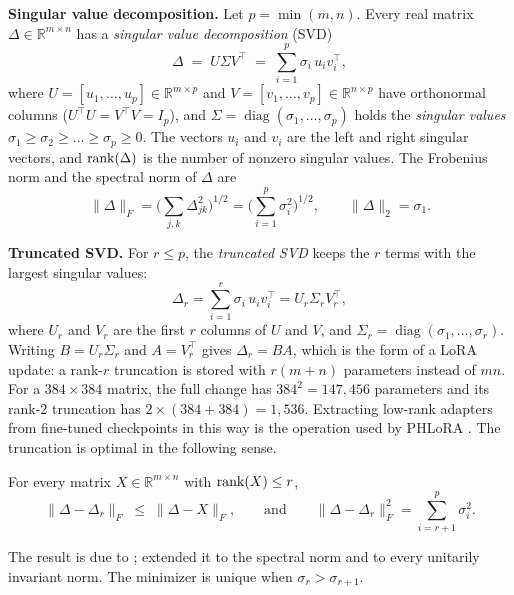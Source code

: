 \textbf{Singular value decomposition.} Let $p=\min(m,n)$. Every real matrix $\Delta\in\mathbb{R}^{m\times n}$ has a \emph{singular value decomposition} (SVD) \cite{golub2013matrix}
\begin{equation}
\Delta \;=\; U\Sigma V^\top \;=\; \sum_{i=1}^{p}\sigma_i\,u_i v_i^\top ,
\label{eq:svdfull}
\end{equation}
where $U=[u_1,\dots,u_p]\in\mathbb{R}^{m\times p}$ and $V=[v_1,\dots,v_p]\in\mathbb{R}^{n\times p}$ have orthonormal columns ($U^\top U=V^\top V=I_p$), and $\Sigma=\operatorname{diag}(\sigma_1,\dots,\sigma_p)$ holds the \emph{singular values} $\sigma_1\ge\sigma_2\ge\dots\ge\sigma_p\ge 0$. The vectors $u_i$ and $v_i$ are the left and right singular vectors, and $\operatorname{rank}(\Delta)$ is the number of nonzero singular values. The Frobenius norm and the spectral norm of $\Delta$ are
\begin{equation}
\|\Delta\|_F=\Big(\sum_{j,k}\Delta_{jk}^2\Big)^{1/2}=\Big(\sum_{i=1}^{p}\sigma_i^2\Big)^{1/2},
\qquad \|\Delta\|_2=\sigma_1 .
\end{equation}

\textbf{Truncated SVD.} For $r\le p$, the \emph{truncated SVD} keeps the $r$ terms with the largest singular values:
\begin{equation}
\Delta_r=\sum_{i=1}^{r}\sigma_i\,u_i v_i^\top=U_r\Sigma_r V_r^\top ,
\label{eq:svd}
\end{equation}
where $U_r$ and $V_r$ are the first $r$ columns of $U$ and $V$, and $\Sigma_r=\operatorname{diag}(\sigma_1,\dots,\sigma_r)$. Writing $B=U_r\Sigma_r$ and $A=V_r^\top$ gives $\Delta_r=BA$, which is the form of a LoRA update: a rank-$r$ truncation is stored with $r(m+n)$ parameters instead of $mn$. For a $384\times384$ matrix, the full change has $384^2=147{,}456$ parameters and its rank-2 truncation has $2\times(384+384)=1{,}536$. Extracting low-rank adapters from fine-tuned checkpoints in this way is the operation used by PHLoRA \cite{vasani2025phlora}. The truncation is optimal in the following sense.

\begin{theorem}
\label{thm:eckart}
For every matrix $X\in\mathbb{R}^{m\times n}$ with $\operatorname{rank}(X)\le r$,
\[
\|\Delta-\Delta_r\|_F\;\le\;\|\Delta-X\|_F,
\qquad\text{and}\qquad
\|\Delta-\Delta_r\|_F^2=\sum_{i=r+1}^{p}\sigma_i^2 .
\]
\end{theorem}

The result is due to ;  extended it to the spectral norm and to every unitarily invariant norm. The minimizer is unique when $\sigma_r>\sigma_{r+1}$.

